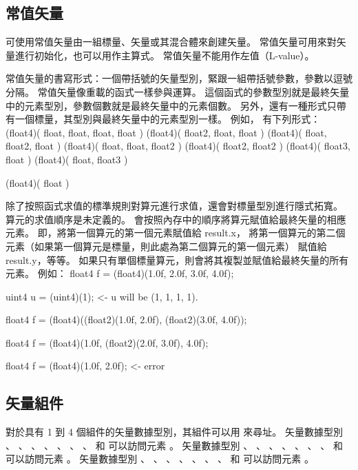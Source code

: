 \subsection{常值矢量}

可使用常值矢量由一組標量、矢量或其混合體來創建矢量。
常值矢量可用來對矢量進行初始化，也可以用作主算式。
常值矢量不能用作左值（L-value）。

常值矢量的書寫形式：一個帶括號的矢量型別，緊跟一組帶括號參數，參數以逗號分隔。
常值矢量像重載的函式一樣參與運算。
這個函式的參數型別就是最終矢量中的元素型別，參數個數就是最終矢量中的元素個數。
另外，還有一種形式只帶有一個標量，其型別與最終矢量中的元素型別一樣。
例如，  有下列形式：
\startclc
(float4)( float, float, float, float )
(float4)( float2, float, float )
(float4)( float, float2, float )
(float4)( float, float, float2 )
(float4)( float2, float2 )
(float4)( float3, float )
(float4)( float, float3 )

(float4)( float )
\stopclc

除了按照函式求值的標準規則對算元進行求值，還會對標量型別進行隱式拓寬。
算元的求值順序是未定義的。
會按照內存中的順序將算元賦值給最終矢量的相應元素。
即，將第一個算元的第一個元素賦值給 result.x，
將第一個算元的第二個元素（如果第一個算元是標量，則此處為第二個算元的第一個元素）
賦值給 result.y，等等。
如果只有單個標量算元，則會將其複製並賦值給最終矢量的所有元素。
例如：
\startclc
float4	f = (float4)(1.0f, 2.0f, 3.0f, 4.0f);

uint4	u = (uint4)(1);		<- u will be (1, 1, 1, 1).

float4	f = (float4)((float2)(1.0f, 2.0f),
		     (float2)(3.0f, 4.0f));

float4	f = (float4)(1.0f, (float2)(2.0f, 3.0f), 4.0f);

float4	f = (float4)(1.0f, 2.0f);	<- error
\stopclc

\subsection{矢量組件}

對於具有 1 到 4 個組件的矢量數據型別，其組件可以用  來尋址。
矢量數據型別 、 、 、 、
 、 、 、  和 
 可以訪問元素 。
矢量數據型別 、 、 、 、
 、 、 、  和 
 可以訪問元素 。
矢量數據型別 、 、 、 、
 、 、 、  和 
 可以訪問元素 。

